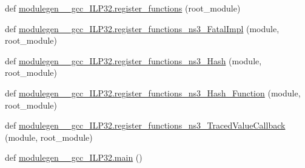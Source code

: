 \begin{DoxyCompactItemize}
\item 
def \hyperlink{namespacemodulegen____gcc__ILP32_a78223e19764a9a9c4a101c5cff0fe501}{modulegen\+\_\+\+\_\+gcc\+\_\+\+I\+L\+P32.\+register\+\_\+functions} (root\+\_\+module)
\item 
def \hyperlink{namespacemodulegen____gcc__ILP32_afe103c28425c708bef38a8cb16badb60}{modulegen\+\_\+\+\_\+gcc\+\_\+\+I\+L\+P32.\+register\+\_\+functions\+\_\+ns3\+\_\+\+Fatal\+Impl} (module, root\+\_\+module)
\item 
def \hyperlink{namespacemodulegen____gcc__ILP32_a15bbba0d88ee02afb1f5d32d8a94ea14}{modulegen\+\_\+\+\_\+gcc\+\_\+\+I\+L\+P32.\+register\+\_\+functions\+\_\+ns3\+\_\+\+Hash} (module, root\+\_\+module)
\item 
def \hyperlink{namespacemodulegen____gcc__ILP32_a0f9329a49ae57d68c45aee88be7a193f}{modulegen\+\_\+\+\_\+gcc\+\_\+\+I\+L\+P32.\+register\+\_\+functions\+\_\+ns3\+\_\+\+Hash\+\_\+\+Function} (module, root\+\_\+module)
\item 
def \hyperlink{namespacemodulegen____gcc__ILP32_af7ef11aed69cbf420d75dc2f54dcef3d}{modulegen\+\_\+\+\_\+gcc\+\_\+\+I\+L\+P32.\+register\+\_\+functions\+\_\+ns3\+\_\+\+Traced\+Value\+Callback} (module, root\+\_\+module)
\item 
def \hyperlink{namespacemodulegen____gcc__ILP32_aadf64690f6ba129a8d42469ea6da5a2d}{modulegen\+\_\+\+\_\+gcc\+\_\+\+I\+L\+P32.\+main} ()
\end{DoxyCompactItemize}
